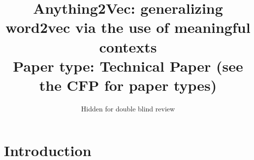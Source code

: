 \documentclass[letterpaper]{article}
\title{Anything2Vec: generalizing word2vec via the use of meaningful contexts \\
Paper type: Technical Paper (see the CFP for paper types)}
\author{ %
  Hidden for double blind review
}
\begin{document}
 
\maketitle
\begin{abstract}

\end{abstract}

\section{Introduction}




\end{document}

